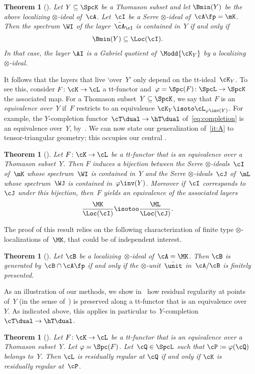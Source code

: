 \documentclass[11pt]{amsart}
\numberwithin{equation}{section} %
\theoremstyle{plain}
\newtheorem{thm}[equation]{Theorem}
\theoremstyle{definition}
\theoremstyle{remark}
\begin{document}
%
\begin{thm}[{}]
\label{thm:bookend-intro}%
Let $Y\subseteq\SpcK$ be a Thomason subset and let $\Bmin(Y)$ be the above localizing $\otimes$-ideal of~$\cA$.
Let~$\cI$ be a Serre $\otimes$-ideal of~$\cA\fp=\mK$. Then the spectrum $\WI$ of the layer~$\bar\cA_\cI$ is contained in~$Y$ if and only if
%
\[
\Bmin(Y)\subseteq \Loc(\cI).
\]
%
In that case, the layer $\AI$ is a Gabriel quotient of~$\Modd{\cK_Y}$ by a localizing $\otimes$-ideal.
\end{thm}

It follows that the layers that live `over~$Y$' only depend on the tt-ideal~$\cK_Y$. To see this, consider $F\colon \cK\to \cL$ a tt-functor and~$\varphi=\Spc(F)\colon \SpcL\to \SpcK$ the associated map. For a Thomason subset~$Y\subseteq \SpcK$, we say that $F$ is an \emph{equivalence over~$Y$} if~$F$ restricts to an equivalence $\cK_Y\isoto \cL_{\varphi\inv(Y)}$.
For example, the $Y$-completion functor~$\cT\dual\to \hT\dual$ of~\eqref{eq:completion} is an equivalence over~$Y$, by~\cite[Theorem~4.6]{BalmerSanders25}.
We can now state our generalization of~\eqref{it:A} to tensor-triangular geometry; this occupies our central .
%
\begin{thm}[{}]
\label{thm:main-intro}%
Let $F\colon \cK\to \cL$ be a tt-functor that is an equivalence over a Thomason subset~$Y$. Then $F$ induces a bijection between the Serre $\otimes$-ideals~$\cI$ of~$\mK$ whose spectrum~$\WI$ is contained in~$Y$ and the Serre $\otimes$-ideals~$\cJ$ of~$\mL$ whose spectrum~$\WJ$ is contained in~$\varphi\inv(Y)$. Moreover if~$\cI$ corresponds to~$\cJ$ under this bijection, then~$F$ yields an equivalence of the associated layers
%
\begin{equation*}
\frac{\MK}{\Loc(\cI)}\isotoo\frac{\ML}{\Loc(\cJ)}.
\end{equation*}
% 
\end{thm}

The proof of this result relies on the following characterization of finite type $\otimes$-localizations of~$\MK$, that could be of independent interest.
%
\begin{thm}[{}]
\label{thm:finite-type-intro}%
Let $\cB$ be a localizing~$\otimes$-ideal of~$\cA=\MK$. Then $\cB$ is generated by~$\cB\cap \cA\fp$ if and only if the $\otimes$-unit~$\bar{\unit}$ in~$\cA/\cB$ is finitely presented.
\end{thm}

As an illustration of our methods, we show in~ how residual regularity at points of~$Y$ (in the sense of~\cite{VanRooy26}) is preserved along a tt-functor that is an equivalence over~$Y$.
As indicated above, this applies in particular to~$Y$-completion~$\cT\dual\to \hT\dual$.
%
\begin{thm}[{}]
\label{thm:regularity-intro}%
Let $F\colon \cK\to \cL$ be a tt-functor that is an equivalence over a Thomason subset~$Y$. Let $\varphi=\Spc(F)$. Let~$\cQ \in \SpcL$ such that $\cP\coloneq\varphi(\cQ)$ belongs to~$Y$. Then $\cL$ is residually regular at $\cQ$ if and only if $\cK$ is residually regular at~$\cP$. 
\end{thm}
\end{document}

